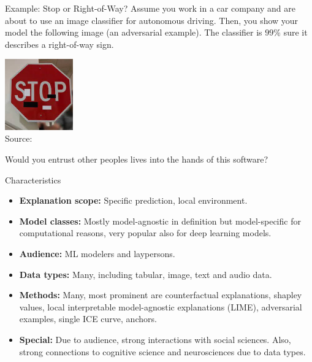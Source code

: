 \documentclass[aspectratio=169]{../latex_main/tntbeamer}  %
\begin{document}

\begin{frame}{Example: Stop or Right-of-Way?}
Assume you work in a car company and are about to use an image classifier for autonomous driving. Then, you show your model the following image (an adversarial example). The classifier is $99\%$ sure it describes a right-of-way sign.
	\begin{center}
		\includegraphics[width=0.22\textwidth]{figure/IntroStop.jpg}\\
		{Source: }
	\end{center}
	Would you entrust other peoples lives into the hands of this software?
\end{frame}

\begin{frame}[c]{Characteristics}
	\begin{itemize}
		\item \textbf{Explanation scope:} Specific prediction, local environment.
		\pause\smallskip
		\item \textbf{Model classes:} Mostly model-agnostic in definition but model-specific for computational reasons, very popular also for deep learning models.
		\pause\smallskip
		\item \textbf{Audience:} ML modelers and laypersons.
		\pause\smallskip
		\item \textbf{Data types:} Many, including tabular, image, text and audio data.
		\pause\smallskip
		\item \textbf{Methods:} Many, most prominent are counterfactual explanations, shapley values, local interpretable model-agnostic explanations (LIME), adversarial examples, single ICE curve, anchors.
		\pause\smallskip
		\item \textbf{Special:} Due to audience, strong interactions with social sciences. Also, strong connections to cognitive science and neurosciences due to data types.
	\end{itemize}
\end{frame}
\end{document}

